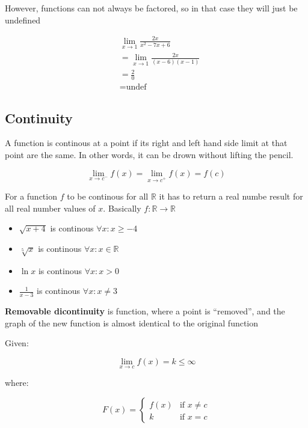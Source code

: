 \documentclass[12pt]{article}
\newcommand{\R}{{\mathbb{R}}}
\begin{document}
        However, functions can not always be factored, so in that case they will just be undefined

        \[
            \begin{aligned}
                & \lim_{x \to 1} \frac{2x}{x^2 - 7x + 6} \\
                &= \lim_{x \to 1} \frac{2x}{(x -6)(x -1)} \\
                &= \frac{2}{0} \\
                &= \text{undef}
            \end{aligned}    
        \]

        \subsection{Continuity}

        A function is continous at a point if its right and left hand side limit at that point are the same. 
        In other words, it can be drown without lifting the pencil.

        \[
            \lim_{x \to c^-} f(x) = \lim_{x \to c^+} f(x) = f(c)    
        \]

        For a function $f$ to be continous for all $\R$ it has to return a real numbe result for all 
        real number values of $x$. Basically $f: \R \to \R$ 

        \begin{itemize}
            
            \item $\sqrt{x + 4}$ is continous $\forall x: x \ge -4$
            \item $\sqrt[5]{x}$ is continous $\forall x: x \in \R$
            \item $\ln x$ is continous $\forall x: x > 0$
            \item $\frac{1}{x-3}$ is continous $\forall x: x \ne 3$

        \end{itemize}

        \textbf{Removable dicontinuity} is function, where a point is ``removed'', and the graph of the new function 
        is almost identical to the original function
        
        \noindent Given:

        \[
            \lim_{x \to c} f(x) = k \le \infty
        \]

        \noindent where:

        \[
            F(x) = \begin{cases}
                f(x) & \text{if } x \ne c \\
                k & \text{if } x = c
            \end{cases}
        \]
\end{document}
